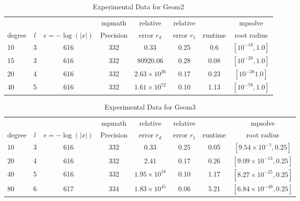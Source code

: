 \documentclass[sigconf]{acmart}
\begin{document}
\begin{table}[t]
\caption{Experimental Data for Geom2}
\label{tab:geom2}
\vskip 0.15in
\begin{center}
\begin{small}
\begin{sc}
\begin{tabular}{lccccccc}
\toprule
&  &  & mpmath & relative  & relative &  & mpsolve \\
degree  & $l$& $e=-\log(|x|)$& Precision &error $r_d$       & error $r_1$ &runtime& root radius\\
\midrule
   10 & 3 & 616 & 332 & 0.33 & 0.25 & 0.6 & $[10^{-18},1.0]$ \\
   15 & 3 & 616 & 332 & 80920.06  & 0.28 & 0.08 & $[10^{-28},1.0]$\\
   20 & 4 & 616 & 332 & $2.63 \times 10^{26}$ & 0.17 & 0.23 & $[10^{-38}1.0]$\\ %
   40 & 5 & 616 & 332 &  $1.61 \times 10^{72}$ & 0.10 & 1.13 & $[10^{-78},1.0]$\\ %
\bottomrule
\end{tabular}
\end{sc}
\end{small}
\end{center}
\vskip -0.1in
\end{table}

\begin{table}[t]
\caption{Experimental Data for Geom3}
\label{tab:geom3}
\vskip 0.15in
\begin{center}
\begin{small}
\begin{sc}
\begin{tabular}{lccccccc}
\toprule
&  &  & mpmath & relative  & relative &  & mpsolve \\
degree  & $l$& $e=-\log(|x|)$& Precision &error $r_d$       & error $r_1$ &runtime& root radius\\
\midrule
   10 & 3 & 616 & 332 & 0.33 & 0.25 & 0.05 & $[9.54 \times 10^{-7},0.25]$ \\
   20 & 4 & 616 & 332 & 2.41 & 0.17 & 0.26 & $[9.09 \times 10^{-13},0.25]$\\
   40 & 5 & 616 & 332 & $1.95 \times 10^{18}$ & 0.10 & 1.17 & $[8.27 \times 10^{-25},0.25]$\\ %
   80 & 6 & 617 & 334 & $1.83 \times 10^{45}$ & 0.06 & 5.21 & $[6.84 \times 10^{-49},0.25]$\\ %
\bottomrule
\end{tabular}
\end{sc}
\end{small}
\end{center}
\vskip -0.1in
\end{table}
\end{document}
